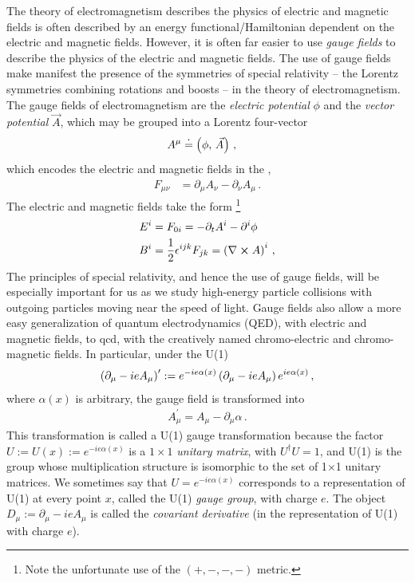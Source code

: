 The theory of electromagnetism describes the physics of electric and magnetic fields is often described by an energy functional/Hamiltonian dependent on the electric and magnetic fields.
%
However, it is often far easier to use \textit{gauge fields} to describe the physics of the electric and magnetic fields.
%
The use of gauge fields make manifest the presence of the symmetries of special relativity -- the Lorentz symmetries combining rotations and boosts -- in the theory of electromagnetism.
%
The gauge fields of electromagnetism are the \textit{electric potential} \(\phi\) and the \textit{vector potential} \(\vec{A}\), which may be grouped into a Lorentz four-vector
\begin{align}
    A^\mu &\overset{\boldsymbol{\cdot}}{=} \left(\phi, \, \vec{A}\right)
    \,,
\end{align}
which encodes the electric and magnetic fields in the ,
\begin{align}
    F_{\mu\nu} &= \partial_\mu A_\nu - \partial_\nu A_\mu
    \,.
\end{align}
%
The electric and magnetic fields take the form%
\footnote{
    Note the unfortunate use of the \((+,-,-,-)\) metric.
}
\begin{align}
    E^i &= F_{0i} = -\partial_t A^i - \partial^i \phi
    \\
    B^i
    &=
    {\frac{1}{2}} \epsilon^{ijk} F_{jk}
    =
    \left(\nabla \cross A\right)^i
    \,,
\end{align}
%
The principles of special relativity, and hence the use of gauge fields, will be especially important for us as we study high-energy particle collisions with outgoing particles moving near the speed of light.
%
Gauge fields also allow a more easy generalization of quantum electrodynamics (QED), with electric and magnetic fields, to \gls{qcd}, with the creatively named chromo-electric and chromo-magnetic fields.
%
In particular, under the U(1) 
\begin{align}
    \left(\partial_\mu - i e A_\mu\right)^\prime
    :=
    e^{-i e \alpha(x)}
    \left(\partial_\mu - i e A_\mu\right)
    e^{i e \alpha(x)}
    \,,
\end{align}
where \(\alpha(x)\) is arbitrary, the gauge field is transformed into
\begin{align}
    A^\prime_{\mu}
    =
    A_\mu
    -
    \partial_\mu \alpha
    \,.
\end{align}
%
This transformation is called a U(1) gauge transformation because the factor \(U := U(x) := e^{-i e \alpha(x)}\) is a \(1 \times 1\) \textit{unitary matrix}, with \(U^\dagger U = 1\), and U(1) is the group whose multiplication structure is isomorphic to the set of 1\(\times\)1 unitary matrices.
%
We sometimes say that \(U = e^{-i e \alpha(x)}\) corresponds to a representation of U(1) at every point \(x\), called the U(1) \textit{gauge group}, with charge \(e\).
%
The object \(D_\mu := \partial_\mu - i e A_\mu\) is called the \textit{covariant derivative} (in the representation of U(1) with charge \(e\)).


